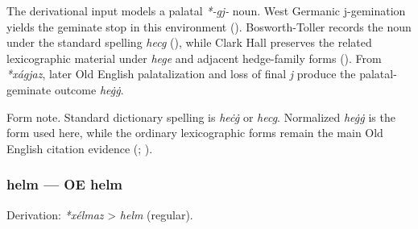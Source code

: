 \documentclass[
  british,
  a4paper,
]{article}
\begin{document}
The derivational input models a palatal \emph{*-gj-} noun. West Germanic
j-gemination yields the geminate stop in this environment
(). Bosworth-Toller
records the noun under the standard spelling \emph{hecg}
(),
while Clark Hall preserves the related lexicographic material under
\emph{hege} and adjacent hedge-family forms
(). From
\emph{*xágjaz}, later Old English palatalization and loss of final
\emph{j} produce the palatal-geminate outcome \emph{heġġ}.

Form note. Standard dictionary spelling is \emph{heċġ} or \emph{hecg}.
Normalized \emph{heġġ} is the form used here, while the ordinary
lexicographic forms remain the main Old English citation evidence
(;
).

\subsubsection{helm --- OE helm}\label{helm-oe-helm}

Derivation: \emph{*xélmaz} \textgreater{} \emph{helm} (regular).

\begingroup
\setlength{\fboxsep}{6pt}
\end{document}
